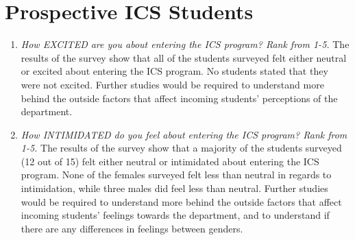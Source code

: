 \section{Prospective ICS Students}
\begin{enumerate}
\begin{figure}[h]
\centering
\texttt{[image: sr-excited-intimidated]}
\caption{Results for prospective ICS Students survey}
\end{figure}
\item\textit{How EXCITED are you about entering the ICS program? Rank from 1-5.}
The results of the survey show that all of the students surveyed felt either neutral or excited about entering the ICS program. No students stated that they were not excited. Further studies would be required to understand more behind the outside factors that affect incoming students' perceptions of the department. 
\item \textit{How INTIMIDATED do you feel about entering the ICS program? Rank from 1-5.}
The results of the survey show that a majority of the students surveyed (12 out of 15) felt either neutral or intimidated about entering the ICS program. None of the females surveyed felt less than neutral in regards to intimidation, while three males did feel less than neutral. Further studies would be required to understand more behind the outside factors that affect incoming students' feelings towards the department, and to understand if there are any differences in feelings between genders.
\end{enumerate}

